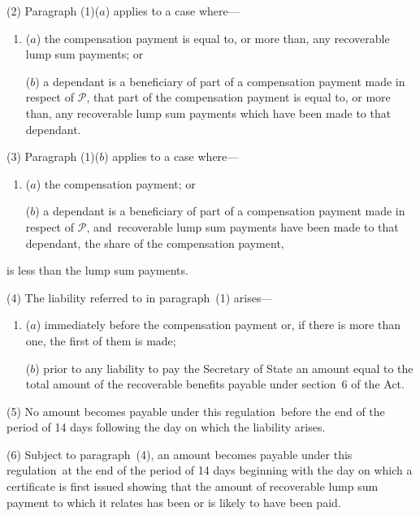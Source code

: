 \documentclass[12pt,a4paper]{article}
\begin{document}
(2) Paragraph (1)($a$)  applies to a case where—
\begin{enumerate}\item[]
($a$) the compensation payment is equal to, or more than, any recoverable lump sum payments; or

($b$) a dependant is a beneficiary of part of a compensation payment made in respect of $\mathcal{P}$, that part of the compensation payment is equal to, or more than, any recoverable lump sum payments which have been made to that dependant.
\end{enumerate}

(3) Paragraph (1)($b$)  applies to a case where—
\begin{enumerate}\item[]
($a$) the compensation payment; or

($b$) a dependant is a beneficiary of part of a compensation payment made in respect of $\mathcal{P}$, and~recoverable lump sum payments have been made to that dependant, the share of the compensation payment,
\end{enumerate}
is less than the lump sum payments.

(4) The liability referred to in paragraph~(1) arises—
\begin{enumerate}\item[]
($a$) immediately before the compensation payment or, if there is more than one, the first of them is made;

($b$) prior to any liability to pay the Secretary of State an amount equal to the total amount of the recoverable benefits payable under section~6 of the Act.
\end{enumerate}

(5) No amount becomes payable under this regulation~before the end of the period of 14 days following the day on which the liability arises.

(6) Subject to paragraph~(4), an amount becomes payable under this regulation~at the end of the period of 14 days beginning with the day on which a certificate is first issued showing that the amount of recoverable lump sum payment to which it relates has been or is likely to have been paid.
\end{document}
